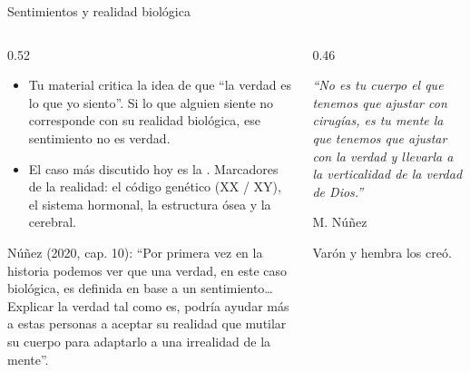 \begin{frame}{Sentimientos y realidad biológica}
\begin{columns}[c,onlytextwidth]
\begin{column}{0.52\textwidth}\small
\begin{itemize}
\item Tu material critica la idea de que ``la verdad es lo que yo siento''. Si lo que alguien siente no corresponde con su realidad biológica, ese sentimiento no es verdad.
\item El caso más discutido hoy es la . Marcadores de la realidad: el código genético (XX / XY), el sistema hormonal, la estructura ósea y la cerebral.
\end{itemize}
\scriptsize Núñez (2020, cap. 10): ``Por primera vez en la historia podemos ver que una verdad, en este caso biológica, es definida en base a un sentimiento\ldots{} Explicar la verdad tal como es, podría ayudar más a estas personas a aceptar su realidad que mutilar su cuerpo para adaptarlo a una irrealidad de la mente''.
\end{column}
\begin{column}{0.46\textwidth}
\begin{tcolorbox}[colback=papiro,colframe=dorado,boxrule=1.2pt,arc=3pt]
\small\itshape ``No es tu cuerpo el que tenemos que ajustar con cirugías, es tu mente la que tenemos que ajustar con la verdad y llevarla a la verticalidad de la verdad de Dios.''\par\smallskip\upshape\hfill\scriptsize M. Núñez
\end{tcolorbox}
\begin{cita}Varón y hembra los creó.\end{cita}
\end{column}
\end{columns}
\end{frame}

